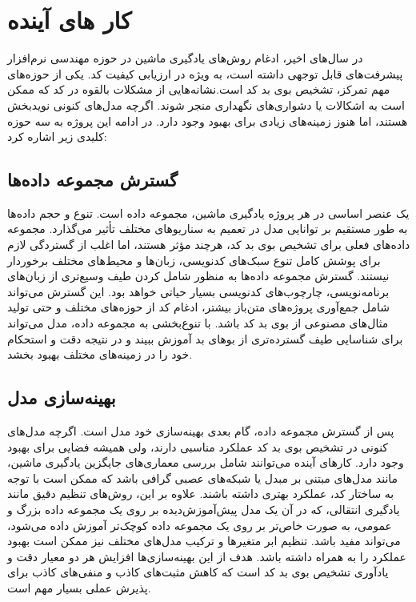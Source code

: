\section{کار های آینده}

در سال‌های اخیر، ادغام روش‌های یادگیری ماشین در حوزه مهندسی نرم‌افزار پیشرفت‌های قابل توجهی داشته است، به ویژه در ارزیابی کیفیت کد. یکی از حوزه‌های مهم تمرکز، تشخیص بوی بد کد است.نشانه‌هایی از مشکلات بالقوه در کد که ممکن است به اشکالات یا دشواری‌های نگهداری منجر شوند. اگرچه مدل‌های کنونی نویدبخش هستند، اما هنوز زمینه‌های زیادی برای بهبود وجود دارد. در ادامه این پروژه به سه حوزه کلیدی زیر اشاره کرد:

\subsection{گسترش مجموعه داده‌ها}
یک عنصر اساسی در هر پروژه یادگیری ماشین، مجموعه داده است. تنوع و حجم داده‌ها به طور مستقیم بر توانایی مدل در تعمیم به سناریوهای مختلف تأثیر می‌گذارد. مجموعه داده‌های فعلی برای تشخیص بوی بد کد، هرچند مؤثر هستند، اما اغلب از گستردگی لازم برای پوشش کامل تنوع سبک‌های کدنویسی، زبان‌ها و محیط‌های مختلف برخوردار نیستند. گسترش مجموعه داده‌ها به منظور شامل کردن طیف وسیع‌تری از زبان‌های برنامه‌نویسی، چارچوب‌های کدنویسی بسیار حیاتی خواهد بود. این گسترش می‌تواند شامل جمع‌آوری پروژه‌های متن‌باز بیشتر، ادغام کد از حوزه‌های مختلف و حتی تولید مثال‌های مصنوعی از بوی بد کد باشد. با تنوع‌بخشی به مجموعه داده، مدل می‌تواند برای شناسایی طیف گسترده‌تری از بوهای بد آموزش ببیند و در نتیجه دقت و استحکام خود را در زمینه‌های مختلف بهبود بخشد.

\subsection{بهینه‌سازی مدل}

پس از گسترش مجموعه داده، گام بعدی بهینه‌سازی خود مدل است. اگرچه مدل‌های کنونی در تشخیص بوی بد کد عملکرد مناسبی دارند، ولی همیشه فضایی برای بهبود وجود دارد. کارهای آینده می‌توانند شامل بررسی معماری‌های جایگزین یادگیری ماشین، مانند مدل‌های مبتنی بر مبدل یا شبکه‌های عصبی گرافی باشد که ممکن است با توجه به ساختار کد، عملکرد بهتری داشته باشند. علاوه بر این، روش‌های تنظیم دقیق مانند یادگیری انتقالی، که در آن یک مدل پیش‌آموزش‌دیده بر روی یک مجموعه داده بزرگ و عمومی، به صورت خاص‌تر بر روی یک مجموعه داده کوچک‌تر آموزش داده می‌شود، می‌تواند مفید باشد. تنظیم ابر متغیرها و ترکیب مدل‌های مختلف نیز ممکن است بهبود عملکرد را به همراه داشته باشد. هدف از این بهینه‌سازی‌ها افزایش هر دو معیار دقت و یادآوری تشخیص بوی بد کد است که کاهش مثبت‌های کاذب و منفی‌های کاذب برای پذیرش عملی بسیار مهم است.

